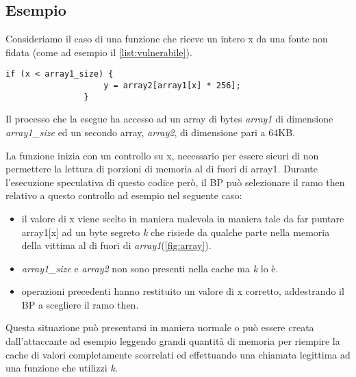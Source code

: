 		\subsection{Esempio}
		
			Consideriamo il caso di una funzione che riceve un intero x da una fonte non fidata (come ad esempio il \cref{list:vulnerabile}).
			
			\begin{lstlisting}[caption={Funzione sotto attacco},label={list:vulnerabile}]
				if (x < array1_size) {
					y = array2[array1[x] * 256];
				}
			\end{lstlisting}
			
			Il processo che la esegue ha accesso ad un array di bytes \emph{array1} di dimensione \emph{array1\_size} ed un secondo array, \emph{array2}, di dimensione pari a 64KB.
			
			La funzione inizia con un controllo su x, necessario per essere sicuri di non permettere la lettura di porzioni di memoria al di fuori di array1. Durante l'esecuzione speculativa di questo codice però, il \ac{BP} può selezionare il ramo then relativo a questo controllo ad esempio nel seguente caso:
			
			\begin{itemize}
				\item il valore di x viene scelto in maniera malevola in maniera tale da far puntare array1[x] ad un byte segreto \emph{k} che risiede da qualche parte nella memoria della vittima al di fuori di \emph{array1}(\cref{fig:array}).
				\item \emph{array1\_size} e \emph{array2} non sono presenti nella cache ma \emph{k} lo è.
				\item operazioni precedenti hanno restituito un valore di x corretto, addestrando il \ac{BP} a scegliere il ramo then.
			\end{itemize}
		
			Questa situazione può presentarsi in maniera normale o può essere creata dall'attaccante ad esempio leggendo grandi quantità di memoria per riempire la cache di valori completamente scorrelati ed effettuando una chiamata legittima ad una funzione che utilizzi \emph{k}.
			
